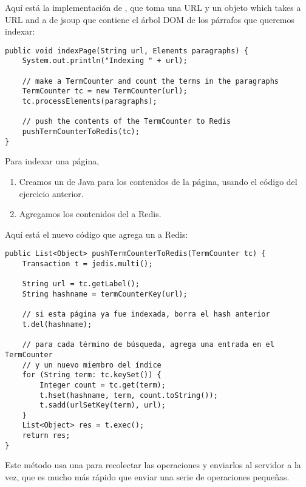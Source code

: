 \documentclass[12pt]{book}
\theoremstyle{exercise}
\begin{document}
Aquí está la implementación de , que toma una URL y un objeto which takes a URL and a
 de jsoup que contiene el árbol DOM de los párrafos que queremos indexar:

\begin{verbatim}
public void indexPage(String url, Elements paragraphs) {
    System.out.println("Indexing " + url);

    // make a TermCounter and count the terms in the paragraphs
    TermCounter tc = new TermCounter(url);
    tc.processElements(paragraphs);

    // push the contents of the TermCounter to Redis
    pushTermCounterToRedis(tc);
}
\end{verbatim}

Para indexar una página,

\begin{enumerate}

\item
  Creamos un  de Java para los contenidos de la página, usando
  el código del ejercicio anterior.

\item
  Agregamos los contenidos del  a Redis.

\end{enumerate}

Aquí está el nuevo código que agrega un  a Redis:

\begin{verbatim}
public List<Object> pushTermCounterToRedis(TermCounter tc) {
    Transaction t = jedis.multi();

    String url = tc.getLabel();
    String hashname = termCounterKey(url);

    // si esta página ya fue indexada, borra el hash anterior
    t.del(hashname);

    // para cada término de búsqueda, agrega una entrada en el TermCounter
    // y un nuevo miembro del índice
    for (String term: tc.keySet()) {
        Integer count = tc.get(term);
        t.hset(hashname, term, count.toString());
        t.sadd(urlSetKey(term), url);
    }
    List<Object> res = t.exec();
    return res;
}
\end{verbatim}

Este método usa una  para recolectar las operaciones y
enviarlos al servidor a la vez, que es mucho más rápido que enviar una
serie de operaciones pequeñas.

\end{document}
